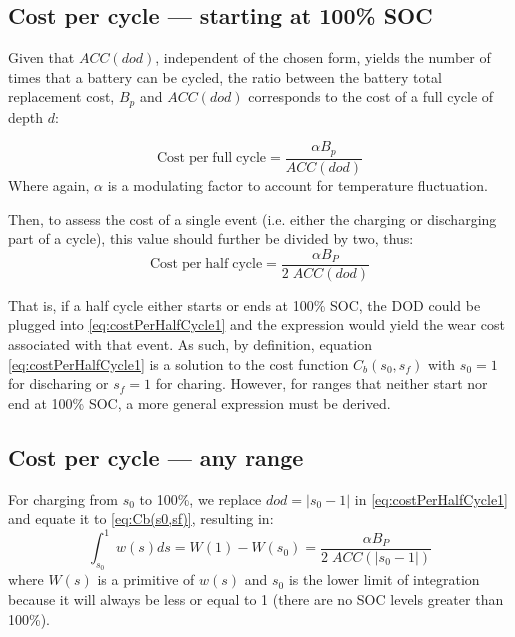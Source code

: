 \documentclass{ieeeaccess}
\begin{document}
    \subsection{Cost per cycle --- starting at 100\% SOC}
    Given that $ACC(dod)$, independent of the chosen form, yields the number of times that a battery can be cycled, the ratio between the battery total replacement cost, $B_p$ and $ACC(dod)$ corresponds to the cost of a full cycle of depth $d$:
    
    $$ \mathrm{Cost \; per \; full \; cycle} = \frac{ \alpha B_p}{ACC(dod)} $$
    Where again, $\alpha$ is a modulating factor to account for temperature fluctuation.
    
    Then, to assess the cost of a single event (i.e. either the charging or discharging part of a cycle), this value should further be divided by two, thus:
    \begin{equation}
        \mathrm{Cost \; per \; half \; cycle} = \frac{ \alpha B_{P}}{2 \; ACC(dod)}
        \label{eq:costPerHalfCycle1}
    \end{equation}

    That is, if a half cycle either starts or ends at 100\% \ac{SOC}, the \ac{DOD} could be plugged into \eqref{eq:costPerHalfCycle1} and the expression would yield the wear cost associated with that event. As such, by definition, equation \eqref{eq:costPerHalfCycle1} is a solution to the cost function $C_b(s_{0}, s_{f})$ with $s_0 = 1$ for discharing or $s_f = 1$ for charing. However, for ranges that neither start nor end at 100\% \ac{SOC}, a more general expression must be derived.

    \subsection{Cost per cycle --- any range}

    For charging from $s_0$ to 100\%, we replace $dod=|s_{0}-1|$ in \eqref{eq:costPerHalfCycle1} and equate it to \eqref{eq:Cb(s0,sf)}, resulting in:
    \small
       $$ \int_{s_{0}}^{1}w(s)ds = W(1) - W(s_{0}) = \frac{\alpha B_{P}}{2 \; ACC(|s_{0}-1|)} $$
	\normalsize
    where $W(s)$ is a primitive of $w(s)$ and $s_{0}$ is the lower limit of integration because it will always be less or equal to 1 (there are no \ac{SOC} levels greater than 100\%).

\end{document}
